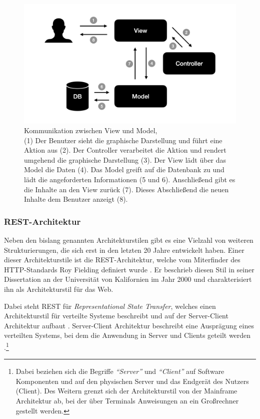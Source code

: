  \begin{figure}
 	\centering
    \includegraphics[width=.6\textwidth]{Assets/Interaktionsorientiert.002}
	\caption[Kommunikation zwischen View und Model]{Kommunikation zwischen View und Model, \\ (1) Der Benutzer sieht die graphische Darstellung und führt eine Aktion aus (2). Der Controller verarbeitet die Aktion und rendert umgehend die graphische Darstellung (3). Der View lädt über das Model die Daten (4). Das Model greift auf die Datenbank zu und lädt die angeforderten Informationen (5 und 6). Anschließend gibt es die Inhalte an den View zurück (7). Dieses Abschließend die neuen Inhalte dem Benutzer anzeigt (8).}
    \label{fig:mvc-vm-kommunikation}
 \end{figure}

\subsubsection{REST-Architektur}

Neben den bislang genannten Architekturstilen gibt es eine Vielzahl von weiteren Strukturierungen, die sich erst in den letzten 20 Jahre entwickelt haben. Einer dieser Architekturstile ist die REST-Architektur, welche vom Miterfinder des HTTP-Standards Roy Fielding definiert wurde \parencite[][S. 128]{starke_effektive_2015}. Er beschrieb diesen Stil in seiner Dissertation an der Universität von Kalifornien im Jahr 2000 und charakterisiert ihn als Architekturstil für das Web.

Dabei steht REST für \textit{Representational State Transfer}, welches einen Architekturstil für verteilte Systeme beschreibt und auf der Server-Client Architektur aufbaut \parencite[][S. 76]{fielding_architectural_2000}. Server-Client Architektur beschreibt eine Ausprägung eines verteilten Systems, bei dem die Anwendung in Server und Clients geteilt werden \parencite[][S. 117]{starke_effektive_2015}.\footnote{Dabei beziehen sich die Begriffe \textit{\enquote{Server}} und \textit{\enquote{Client}} auf Software Komponenten und auf den physischen Server und das Endgerät des Nutzers (Client). Des Weitern grenzt sich der  Architekturstil von der Mainframe Architektur ab, bei der über Terminals Anweisungen an ein Großrechner gestellt werden.}

